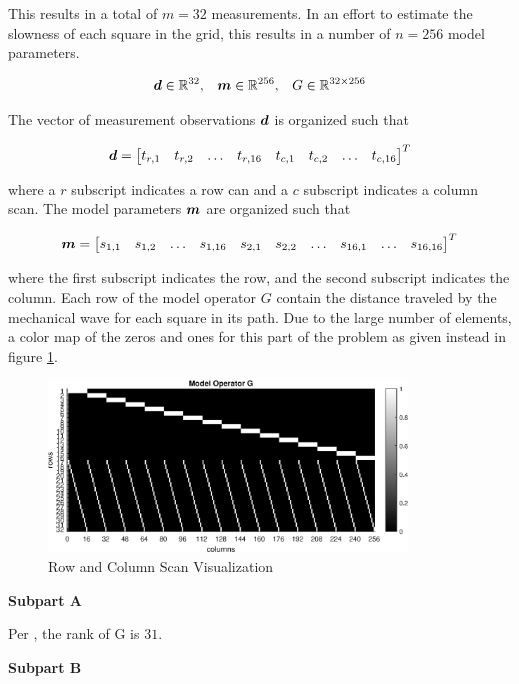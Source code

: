 This results in a total of $m = 32$ measurements. In an effort to estimate the slowness of each square in the grid, this results in a number of $n = 256$ model parameters. 

\begin{align*}
	\boldsymbol{d} \in \mathbb{R}^{32},\,\,\,\,\,\boldsymbol{m} \in \mathbb{R}^{256},\,\,\,\,\,G \in \mathbb{R}^{32 \times 256}
\end{align*}

The vector of measurement observations $\boldsymbol{d}$ is organized such that

\begin{align*}
	\boldsymbol{d} = \begin{bmatrix}
		t_{r,1} & t_{r,2} & \ldots & t_{r,16} & t_{c,1} & t_{c,2} & \ldots & t_{c,16}
	\end{bmatrix}^T
\end{align*}

where a $r$ subscript indicates a row can and a $c$ subscript indicates a column scan. The model parameters $\boldsymbol{m}$ are organized such that

\begin{align*}
	\boldsymbol{m} = \begin{bmatrix}
		s_{1,1} & s_{1,2} & \ldots & s_{1,16} & s_{2,1} & s_{2,2} & \ldots & s_{16,1} & \ldots & s_{16,16}
	\end{bmatrix}^T
\end{align*}

where the first subscript indicates the row, and the second subscript indicates the column. Each row of the model operator $G$ contain the distance traveled by the mechanical wave for each square in its path. Due to the large number of elements, a color map of the zeros and ones for this part of the problem as given instead in figure \ref{fig: prob2 model operator G}.

\begin{figure}[h] 
	\centering
	\includegraphics[width=0.85\textwidth]{./images/prob2_partA_model_operator_G.eps}
	\caption{Row and Column Scan Visualization}
	\label{fig: prob2 model operator G}
\end{figure}
\FloatBarrier

\textbf{Subpart A}

Per \MATLAB, the rank of G is $31$.

\textbf{Subpart B}


